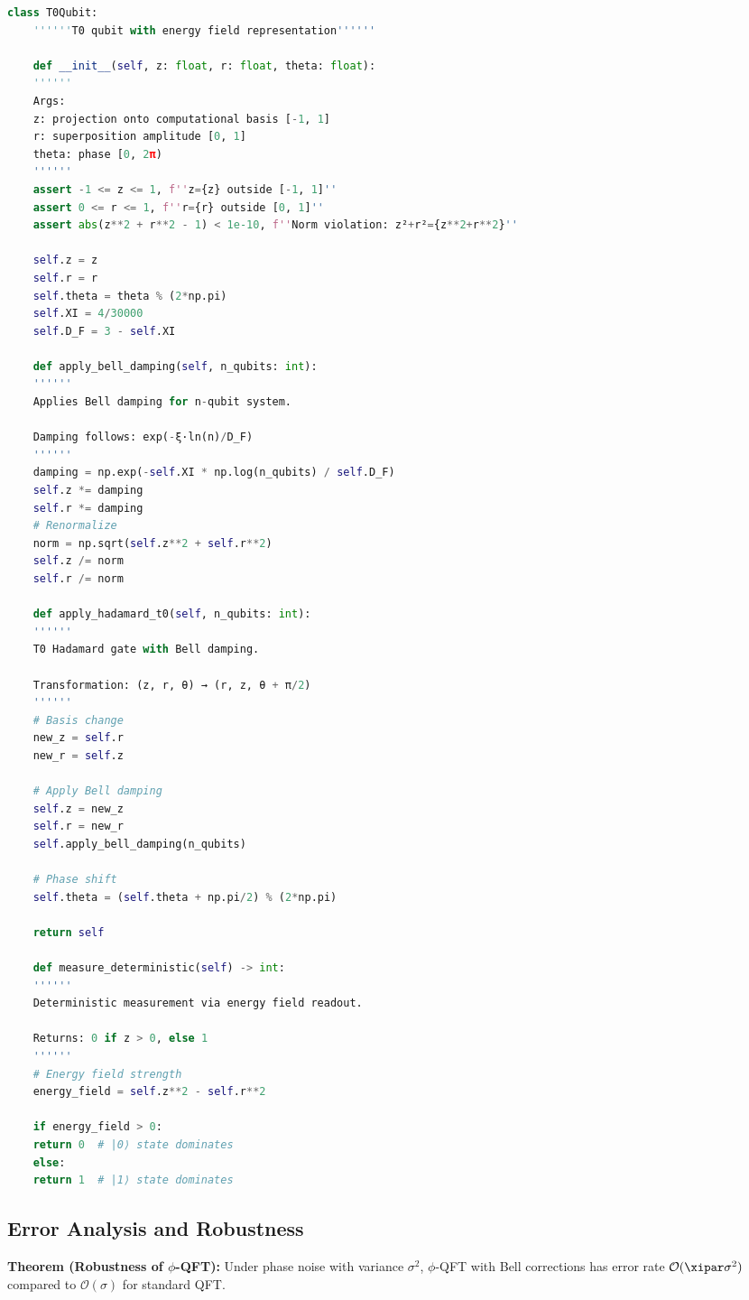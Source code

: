 \begin{lstlisting}[language=Python, caption=Bell damping correction]
	class T0Qubit:
	''''''T0 qubit with energy field representation''''''
	
	def __init__(self, z: float, r: float, theta: float):
	''''''
	Args:
	z: projection onto computational basis [-1, 1]
	r: superposition amplitude [0, 1]
	theta: phase [0, 2π)
	''''''
	assert -1 <= z <= 1, f''z={z} outside [-1, 1]''
	assert 0 <= r <= 1, f''r={r} outside [0, 1]''
	assert abs(z**2 + r**2 - 1) < 1e-10, f''Norm violation: z²+r²={z**2+r**2}''
	
	self.z = z
	self.r = r
	self.theta = theta % (2*np.pi)
	self.XI = 4/30000
	self.D_F = 3 - self.XI
	
	def apply_bell_damping(self, n_qubits: int):
	''''''
	Applies Bell damping for n-qubit system.
	
	Damping follows: exp(-ξ·ln(n)/D_F)
	''''''
	damping = np.exp(-self.XI * np.log(n_qubits) / self.D_F)
	self.z *= damping
	self.r *= damping
	# Renormalize
	norm = np.sqrt(self.z**2 + self.r**2)
	self.z /= norm
	self.r /= norm
	
	def apply_hadamard_t0(self, n_qubits: int):
	''''''
	T0 Hadamard gate with Bell damping.
	
	Transformation: (z, r, θ) → (r, z, θ + π/2)
	''''''
	# Basis change
	new_z = self.r
	new_r = self.z
	
	# Apply Bell damping
	self.z = new_z
	self.r = new_r
	self.apply_bell_damping(n_qubits)
	
	# Phase shift
	self.theta = (self.theta + np.pi/2) % (2*np.pi)
	
	return self
	
	def measure_deterministic(self) -> int:
	''''''
	Deterministic measurement via energy field readout.
	
	Returns: 0 if z > 0, else 1
	''''''
	# Energy field strength
	energy_field = self.z**2 - self.r**2
	
	if energy_field > 0:
	return 0  # |0⟩ state dominates
	else:
	return 1  # |1⟩ state dominates
\end{lstlisting}

\subsection{Error Analysis and Robustness}
\label{app:error_analysis}

\textbf{Theorem (Robustness of $\phi$-QFT):} Under phase noise with variance $\sigma^2$, $\phi$-QFT with Bell corrections has error rate $\mathcal{O}(\xipar \sigma^2)$ compared to $\mathcal{O}(\sigma)$ for standard QFT.

